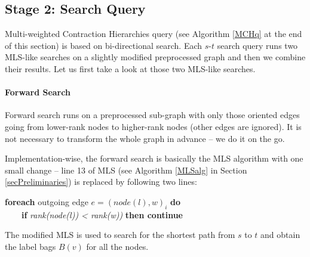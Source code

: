 
\subsection{Stage 2: Search Query}
\label{subsecStage2}

Multi-weighted Contraction Hierarchies query (see Algorithm \ref{MCHq} at the end of this section) is based on bi-directional search.
Each $s$-$t$ search query runs two MLS-like searches on a slightly modified preprocessed graph
and then we combine their results. Let us first take a look at those two MLS-like searches.

\paragraph*{Forward Search}
Forward search runs on a preprocessed sub-graph with only those oriented edges going from 
lower-rank nodes to higher-rank nodes
(other edges are ignored). It is not necessary to transform the whole graph in advance -- we do it on the go.
\vskip 3mm

\noindent Implementation-wise, the forward search is basically the MLS algorithm with one small change -- line 13 of MLS (see Algorithm \ref{MLSalg} in Section \ref{secPreliminaries}) is replaced by following two lines:
\vskip 5mm

{\bf foreach} outgoing edge $e=(node(l),w)_i$ {\bf do}\\
\indent \ \ \ \ {\bf if} {\em rank(node(l)) < rank(w))} {\bf then continue} 

\vskip 5mm
\noindent The modified MLS is used to search for the shortest path from $s$ to $t$ and obtain the label bags $B(v)$ for all the nodes.


